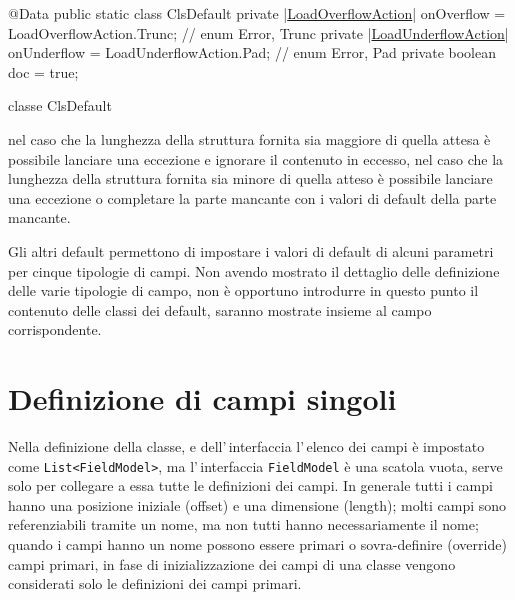 \documentclass[a4paper,10pt]{report}
\newif\ifesource
\newenvironment{elisting}[1][H]
  {\captionsetup{aboveskip=0pt}\begin{listing}[#1]}
  {\end{listing}%
}
\begin{document}
\ifesource
\begin{figure*}[!htb]
\begin{lstlisting}[language=java, caption=classe ClsDefault, 
label=lst:ClsDefault]
@Data
public static class ClsDefault {
    private (*\hyperref[lst:LoadOverflowAction]{LoadOverflowAction}*) onOverflow = LoadOverflowAction.Trunc;   // enum {Error, Trunc}
    private (*\hyperref[lst:LoadUnderflowAction]{LoadUnderflowAction}*) onUnderflow = LoadUnderflowAction.Pad;  // enum {Error, Pad}
    private boolean doc = true;
}
\end{lstlisting}
\end{figure*}
\else
\begin{elisting}[!htb]
\begin{javacode}
@Data
public static class ClsDefault {
    private |\hyperref[lst:LoadOverflowAction]{LoadOverflowAction}| onOverflow = LoadOverflowAction.Trunc;   // enum {Error, Trunc}
    private |\hyperref[lst:LoadUnderflowAction]{LoadUnderflowAction}| onUnderflow = LoadUnderflowAction.Pad;  // enum {Error, Pad}
    private boolean doc = true;
}
\end{javacode}
\caption{classe ClsDefault}
\label{lst:ClsDefault}
\end{elisting}
\fi
nel caso che la lunghezza della struttura fornita sia maggiore di quella attesa
è possibile lanciare una eccezione e ignorare il contenuto in eccesso,
nel caso che la lunghezza della struttura fornita sia minore di quella atteso è
possibile lanciare una eccezione o completare la parte mancante con i valori di
default della parte mancante.

Gli altri default permettono di impostare i valori di default di alcuni 
parametri per cinque tipologie di campi. Non avendo mostrato il dettaglio delle 
definizione delle varie tipologie di campo, non è opportuno introdurre in 
questo punto il contenuto delle classi dei default, saranno mostrate insieme al 
campo corrispondente.

\chapter{Definizione di campi singoli}
Nella definizione della classe, e dell'\,interfaccia l'\,elenco dei campi è
impostato come \verb!List<FieldModel>!, ma l'\,interfaccia \verb!FieldModel! è
una scatola vuota, serve solo per collegare a essa tutte le definizioni dei
campi. In generale tutti i campi hanno una posizione iniziale (offset) e una
dimensione (length); molti campi sono referenziabili tramite un nome, 
ma non tutti hanno necessariamente il nome; quando i campi hanno un nome
possono essere primari o sovra-definire (override) campi primari, in fase di 
inizializzazione dei campi di una classe vengono considerati solo le definizioni
dei campi primari.
\end{document}
